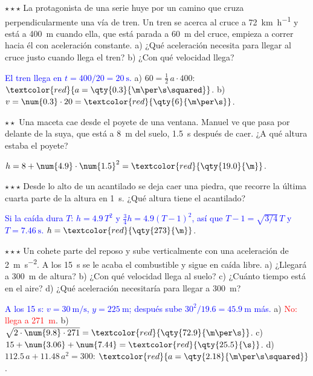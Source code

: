 \begin{exercise}
    \(\star\star\star\) La protagonista de una serie huye por un camino que cruza perpendicularmente una vía de tren. Un tren se
    acerca al cruce a \qty{72}{\km\per\hour} y está a \qty{400}{\m} cuando ella, que está parada a \qty{60}{\m} del cruce, empieza a
    correr hacia él con aceleración constante. a) ¿Qué aceleración necesita para llegar al cruce justo cuando llega el tren? b) ¿Con qué
    velocidad llega?
    \begin{solu}
        \textcolor{blue}{El tren llega en \(t = 400/20 = \qty{20}{\s}\).} a) \(60 = \frac{1}{2}\,a \cdot 400\): \(\textcolor{red}{a =
        \qty{0.3}{\m\per\s\squared}}\). b) \(v = \num{0.3} \cdot 20 = \textcolor{red}{\qty{6}{\m\per\s}}\).
    \end{solu}
\end{exercise}

\begin{exercise}
    \(\star\star\) Una maceta cae desde el poyete de una ventana. Manuel ve que pasa por delante de la suya, que está a \qty{8}{\m} del
    suelo, \qty{1.5}{\s} después de caer. ¿A qué altura estaba el poyete?
    \begin{solu}
        \(h = 8 + \num{4.9} \cdot \num{1.5}^2 = \textcolor{red}{\qty{19.0}{\m}}\).
    \end{solu}
\end{exercise}

\begin{exercise}
    \(\star\star\star\) Desde lo alto de un acantilado se deja caer una piedra, que recorre la última cuarta parte de la altura en
    \qty{1}{\s}. ¿Qué altura tiene el acantilado?
    \begin{solu}
        \textcolor{blue}{Si la caída dura \(T\): \(h = \num{4.9}\,T^2\) y \(\frac{3}{4}h = \num{4.9}(T - 1)^2\), así que \(T - 1 =
        \sqrt{3/4}\,T\) y \(T = \qty{7.46}{\s}\).} \(h = \textcolor{red}{\qty{273}{\m}}\).
    \end{solu}
\end{exercise}

\begin{exercise}
    \(\star\star\star\) Un cohete parte del reposo y sube verticalmente con una aceleración de \qty{2}{\m\per\s\squared}. A los
    \qty{15}{\s} se le acaba el combustible y sigue en caída libre. a) ¿Llegará a \qty{300}{\m} de altura? b) ¿Con qué velocidad
    llega al suelo? c) ¿Cuánto tiempo está en el aire? d) ¿Qué aceleración necesitaría para llegar a \qty{300}{\m}?
    \begin{solu}
        \textcolor{blue}{A los 15 s: \(v = \qty{30}{\m\per\s}\), \(y = \qty{225}{\m}\); después sube \(30^2/\num{19.6} = \qty{45.9}{\m}\) más.}
        a) \textcolor{red}{No: llega a \qty{271}{\m}}. b) \(\sqrt{2 \cdot \num{9.8} \cdot 271} = \textcolor{red}{\qty{72.9}{\m\per\s}}\).
        c) \(15 + \num{3.06} + \num{7.44} = \textcolor{red}{\qty{25.5}{\s}}\). d) \(\num{112.5}\,a + \num{11.48}\,a^2 = 300\):
        \(\textcolor{red}{a = \qty{2.18}{\m\per\s\squared}}\).
    \end{solu}
\end{exercise}

